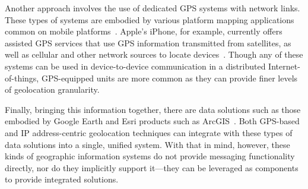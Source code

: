 \documentclass{sbir}
\begin{document}
Another approach involves the use of dedicated GPS systems with network links. These types of systems are embodied by various platform mapping applications common on mobile platforms~\cite{amap:13,gmap:13}. Apple's iPhone, for example, currently offers assisted GPS services that use GPS information transmitted from satellites, as well as cellular and other network sources to locate devices~\cite{amap:13}. Though any of these systems can be used in device-to-device communication in a distributed Internet-of-things, GPS-equipped units are more common as they can provide finer levels of geolocation granularity.

Finally, bringing this information together, there are data solutions such as those embodied by Google Earth and Esri %
products such as ArcGIS~\cite{esri:13,gearth:13}. Both GPS-based and IP address-centric geolocation techniques can integrate with these types of data solutions into a single, unified system. With that in mind, however, these kinds of geographic information systems do not provide messaging functionality directly, nor do they implicitly support it---they can be leveraged as components to provide integrated solutions.
\end{document}
